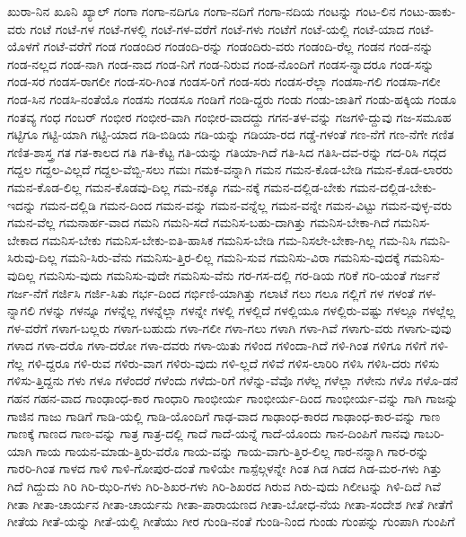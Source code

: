 {ಖುರಾ-ನಿನ
ಖೂನಿ
ಖ್ಯಾಲ್
ಗಂಗಾ
ಗಂಗಾ-ನದಿಗೂ
ಗಂಗಾ-ನದಿಗೆ
ಗಂಗಾ-ನದಿಯ
ಗಂಟನ್ನು
ಗಂಟ-ಲಿನ
ಗಂಟು-ಹಾಕು-ವರು
ಗಂಟೆ
ಗಂಟೆ-ಗಳ
ಗಂಟೆ-ಗಳಲ್ಲಿ
ಗಂಟೆ-ಗಳ-ವರೆಗೆ
ಗಂಟೆ-ಗಳು
ಗಂಟೆಗೆ
ಗಂಟೆ-ಯಲ್ಲಿ
ಗಂಟೆ-ಯಾದ
ಗಂಟೆ-ಯೊಳಗೆ
ಗಂಟೆ-ವರೆಗೆ
ಗಂಡ
ಗಂಡಂದಿರ
ಗಂಡಂದಿ-ರನ್ನು
ಗಂಡಂದಿರು-ವರು
ಗಂಡಂದಿ-ರೆಲ್ಲ
ಗಂಡನ
ಗಂಡ-ನನ್ನು
ಗಂಡ-ನಲ್ಲದ
ಗಂಡ-ನಾಗಿ
ಗಂಡ-ನಾದ
ಗಂಡ-ನಿಗೆ
ಗಂಡ-ನಿರುವ
ಗಂಡ-ನೊಂದಿಗೆ
ಗಂಡಸ-ನ್ನಾದರೂ
ಗಂಡ-ಸನ್ನು
ಗಂಡ-ಸರ
ಗಂಡಸ-ರಾಗಲೀ
ಗಂಡ-ಸರಿ-ಗಿಂತ
ಗಂಡಸ-ರಿಗೆ
ಗಂಡ-ಸರು
ಗಂಡಸ-ರೆಲ್ಲಾ
ಗಂಡಸಾ-ಗಲಿ
ಗಂಡಸಾ-ಗಲೀ
ಗಂಡ-ಸಿನ
ಗಂಡಸಿ-ನಂತೆಯೊ
ಗಂಡಸು
ಗಂಡಸೂ
ಗಂಡಿಗೆ
ಗಂಡಿ-ದ್ದರು
ಗಂಡು
ಗಂಡು-ಜಾತಿಗೆ
ಗಂಡು-ಹಕ್ಕಿಯ
ಗಂಡೂ
ಗಂತವ್ಯ
ಗಂಧ
ಗಂಬರ್
ಗಂಭೀರ
ಗಂಭೀರ-ವಾಗಿ
ಗಂಭೀರ-ವಾದದ್ದು
ಗಗನ-ತಳ-ವನ್ನು
ಗಜಗಳಿ-ದ್ದುವು
ಗಜ-ಸಮೂಹ
ಗಟ್ಟಿಗೂ
ಗಟ್ಟಿ-ಯಾಗಿ
ಗಟ್ಟಿ-ಯಾದ
ಗಡಿ-ಬಿಡಿಯ
ಗಡಿ-ಯನ್ನು
ಗಡಿಯಾ-ರದ
ಗಡ್ಡೆ-ಗಳಂತೆ
ಗಣ-ನೆಗೆ
ಗಣ-ನೆಗೇ
ಗಣಿತ
ಗಣಿತ-ಶಾಸ್ತ್ರ
ಗತ
ಗತ-ಕಾಲದ
ಗತಿ
ಗತಿ-ಕೆಟ್ಟ
ಗತಿ-ಯನ್ನು
ಗತಿಯಾ-ಗಿದೆ
ಗತಿ-ಸಿದ
ಗತಿಸಿ-ದವ-ರನ್ನು
ಗದ-ರಿಸಿ
ಗದ್ಗದ
ಗದ್ದಲ
ಗದ್ದಲ-ವಿಲ್ಲದೆ
ಗದ್ದಲ-ವೆಬ್ಬಿ-ಸಲು
ಗಮಃ
ಗಮಕ-ವನ್ನಾಗಿ
ಗಮನ
ಗಮನ-ಕೊಡ-ಬೇಡಿ
ಗಮನ-ಕೊಡ-ಲಾರರು
ಗಮನ-ಕೊಡ-ಲಿಲ್ಲ
ಗಮನ-ಕೊಡವು-ದಿಲ್ಲ
ಗಮ-ನಕ್ಕೂ
ಗಮ-ನಕ್ಕೆ
ಗಮನ-ದಲ್ಲಿಡ-ಬೇಕು
ಗಮನ-ದಲ್ಲಿಡ-ಬೇಕು-ಇದನ್ನು
ಗಮನ-ದಲ್ಲಿಡಿ
ಗಮನ-ದಿಂದ
ಗಮನ-ವನ್ನು
ಗಮನ-ವನ್ನೆಲ್ಲ
ಗಮನ-ವನ್ನೇ
ಗಮನ-ವಿಟ್ಟು
ಗಮನ-ವುಳ್ಳ-ವರು
ಗಮನ-ವೆಲ್ಲ
ಗಮನಾರ್ಹ-ವಾದ
ಗಮನಿ
ಗಮನಿ-ಸದೆ
ಗಮನಿಸ-ಬಹು-ದಾಗಿತ್ತು
ಗಮನಿಸ-ಬೇಕಾ-ಗಿದೆ
ಗಮನಿಸ-ಬೇಕಾದ
ಗಮನಿಸ-ಬೇಕು
ಗಮನಿಸ-ಬೇಕು-ಐತಿ-ಹಾಸಿಕ
ಗಮನಿಸ-ಬೇಡಿ
ಗಮ-ನಿಸಲೇ-ಬೇಕಾ-ಗಿಲ್ಲ
ಗಮ-ನಿಸಿ
ಗಮನಿ-ಸಿರುವು-ದಿಲ್ಲ
ಗಮನಿ-ಸಿರು-ವೆನು
ಗಮನಿಸು-ತ್ತಿರ-ಲಿಲ್ಲ
ಗಮನಿ-ಸುವ
ಗಮನಿಸು-ವಿರಾ
ಗಮನಿಸು-ವುದಕ್ಕೆ
ಗಮನಿಸು-ವುದಿಲ್ಲ
ಗಮನಿಸು-ವುದು
ಗಮನಿಸು-ವುದೇ
ಗಮನಿಸು-ವೆನು
ಗರ-ಗಸ-ದಲ್ಲಿ
ಗರ-ಡಿಯ
ಗರಿಕೆ
ಗರಿ-ಯಂತೆ
ಗರ್ಜನೆ
ಗರ್ಜ-ನೆಗೆ
ಗರ್ಜಿಸಿ
ಗರ್ಜಿ-ಸಿತು
ಗರ್ಭ-ದಿಂದ
ಗರ್ಭಿಣಿ-ಯಾಗಿತ್ತು
ಗಲಾಟೆ
ಗಲು
ಗಲೂ
ಗಲ್ಲಿಗೆ
ಗಳ
ಗಳಂತೆ
ಗಳ-ನ್ನಾಗಲಿ
ಗಳನ್ನು
ಗಳನ್ನೂ
ಗಳನ್ನೆಲ್ಲ
ಗಳನ್ನೆಲ್ಲಾ
ಗಳನ್ನೇ
ಗಳಲ್ಲಿ
ಗಳಲ್ಲಿದೆ
ಗಳಲ್ಲಿಯೂ
ಗಳಲ್ಲಿರು-ವಷ್ಟು
ಗಳಲ್ಲೂ
ಗಳಲ್ಲೆಲ್ಲ
ಗಳ-ವರೆಗೆ
ಗಳಾಗ-ಬಲ್ಲರು
ಗಳಾಗ-ಬಹುದು
ಗಳಾ-ಗಲೀ
ಗಳಾ-ಗಲು
ಗಳಾಗಿ
ಗಳಾ-ಗಿವೆ
ಗಳಾಗು-ವರು
ಗಳಾಗು-ವುವು
ಗಳಾದ
ಗಳಾ-ದರೊ
ಗಳಾ-ದರೋ
ಗಳಾ-ದವರು
ಗಳಾ-ಯಿತು
ಗಳಿಂದ
ಗಳಿಂದಾ-ಗಿದೆ
ಗಳಿ-ಗಿಂತ
ಗಳಿಗೂ
ಗಳಿಗೆ
ಗಳಿ-ಗೆಲ್ಲ
ಗಳಿ-ದ್ದರೂ
ಗಳಿ-ರುವ
ಗಳಿರು-ವಾಗ
ಗಳಿರು-ವುದು
ಗಳಿ-ಲ್ಲದೆ
ಗಳಿವೆ
ಗಳಿಸ-ಲಾರಿರಿ
ಗಳಿಸಿ
ಗಳಿಸಿ-ದರು
ಗಳಿಸು
ಗಳಿಸು-ತ್ತಿದ್ದನು
ಗಳು
ಗಳೂ
ಗಳೆಂದರೆ
ಗಳೆಂದು
ಗಳೆದು-ರಿಗೆ
ಗಳೆನ್ನು-ವೆವೊ
ಗಳೆಲ್ಲ
ಗಳೆಲ್ಲಾ
ಗಳೇನು
ಗಳೊ
ಗಳೊ-ಡನೆ
ಗಹನ
ಗಹನ-ವಾದ
ಗಾಂಢಾಂಧ-ಕಾರ
ಗಾಂಧಾರಿ
ಗಾಂಭೀರ್ಯ
ಗಾಂಭೀರ್ಯ-ದಿಂದ
ಗಾಂಭೀರ್ಯ-ವನ್ನು
ಗಾಗಿ
ಗಾಜನ್ನು
ಗಾಜಿನ
ಗಾಜು
ಗಾಡಿಗೆ
ಗಾಡಿ-ಯಲ್ಲಿ
ಗಾಡಿ-ಯೊಂದಿಗೆ
ಗಾಢ-ವಾದ
ಗಾಢಾಂಧ-ಕಾರದ
ಗಾಢಾಂಧ-ಕಾರ-ವನ್ನು
ಗಾಣ
ಗಾಣಕ್ಕೆ
ಗಾಣದ
ಗಾಣ-ವನ್ನು
ಗಾತ್ರ
ಗಾತ್ರ-ದಲ್ಲಿ
ಗಾದೆ
ಗಾದೆ-ಯನ್ನೆ
ಗಾದೆ-ಯೊಂದು
ಗಾನ-ದಿಂಪಿಗೆ
ಗಾನವು
ಗಾಬರಿ-ಯಾಗಿ
ಗಾಯ
ಗಾಯನ-ಮಾಡು-ತ್ತಿರು-ವರೊ
ಗಾಯ-ವನ್ನು
ಗಾಯ-ವಾಗು-ತ್ತಿರ-ಲಿಲ್ಲ
ಗಾರ-ನನ್ನಾಗಿ
ಗಾರ-ರನ್ನು
ಗಾರರಿ-ಗಿಂತ
ಗಾಳದ
ಗಾಳಿ
ಗಾಳಿ-ಗೋಪುರ-ದಂತೆ
ಗಾಳಿಯೇ
ಗಾಸ್ಪೆಲ್ಗಳನ್ನೇ
ಗಿಂತ
ಗಿಡ
ಗಿಡದ
ಗಿಡ-ಮರ-ಗಳು
ಗಿತ್ತು
ಗಿದೆ
ಗಿದ್ದುದು
ಗಿರಿ
ಗಿರಿ-ಝರಿ-ಗಳು
ಗಿರಿ-ಶಿಖರ-ಗಳು
ಗಿರಿ-ಶಿಖರದ
ಗಿರುವ
ಗಿರು-ವುದು
ಗಿಲೀಟನ್ನು
ಗಿಳಿ-ದಿದೆ
ಗಿವೆ
ಗೀತಾ
ಗೀತಾ-ಚಾರ್ಯನ
ಗೀತಾ-ಚಾರ್ಯನು
ಗೀತಾ-ಪಾರಾಯಣದ
ಗೀತಾ-ಬೋಧ-ನೆಯ
ಗೀತಾ-ಸಂದೇಶ
ಗೀತೆ
ಗೀತೆಗೆ
ಗೀತೆಯ
ಗೀತೆ-ಯನ್ನು
ಗೀತೆ-ಯಲ್ಲಿ
ಗೀತೆಯು
ಗೀರ
ಗುಂಡಿ-ನಂತೆ
ಗುಂಡಿ-ನಿಂದ
ಗುಂಡು
ಗುಂಪನ್ನು
ಗುಂಪಾಗಿ
ಗುಂಪಿಗೆ
}
